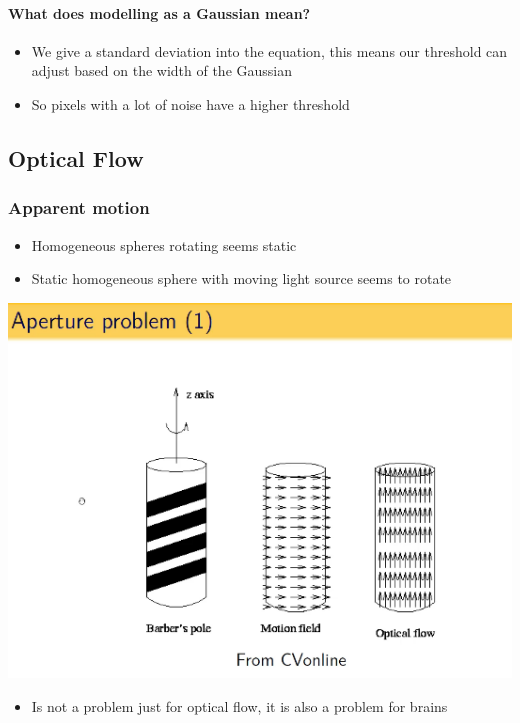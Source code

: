 \documentclass[a4paper]{article}
\begin{document}
\paragraph{What does modelling as a Gaussian mean?}
\label{sec-4-1-4-1}
\begin{itemize}
\item We give a standard deviation into the equation, this means our threshold can adjust based on the width of the Gaussian
\item So pixels with a lot of noise have a higher threshold
\end{itemize}

\subsection{Optical Flow}
\label{sec-4-2}
\subsubsection{Apparent motion}
\label{sec-4-2-1}
\begin{itemize}
\item Homogeneous spheres rotating seems static
\item Static homogeneous sphere with moving light source seems to rotate
\end{itemize}
\includegraphics[width=.9\linewidth]{./app.png}
\begin{itemize}
\item Is not a problem just for optical flow, it is also a problem for brains
\end{itemize}
\end{document}
